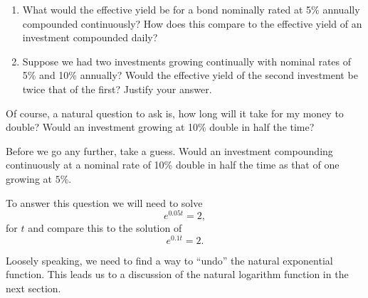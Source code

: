 \begin{myexample}
\begin{embeddedproblem-enumerate}
  \label{problem:ContCompound1}
  \begin{enumerate}[label={\bf{}(\alph*)}]
  \item What would the effective yield be for a bond nominally rated
    at 5\% annually compounded continuously?  How does this compare to
    the effective yield of an investment compounded daily?
  \item Suppose we had two investments growing continually with
    nominal rates of 5\% and 10\% annually?  Would the effective yield
    of the second investment be twice that of the first?  Justify your
    answer.
  \end{enumerate}
\end{embeddedproblem-enumerate}

\begin{embeddedproblem}
  \label{PIC:DoubleInvestment}
  Of course, a natural question to ask is, how long will it take for
  my money to double?  Would an investment growing at 10\% double in
  half the time?

  Before we go any further, take a guess. Would an investment
  compounding continuously at a nominal rate of 10\% double in half
  the time as that of one growing at $5$\%.
\end{embeddedproblem}
To answer this question we will need to solve
$$
e^{0.05t}=2,
$$
for $t$ and compare this to the solution of
$$
e^{0.1t}=2.
$$

Loosely speaking, we need to find a way to ``undo'' the natural
exponential function.  This leads us to a discussion of the natural
logarithm function in the next section.
\end{myexample}




